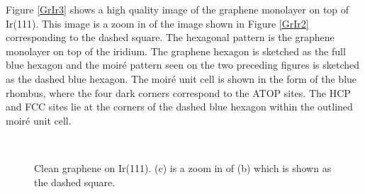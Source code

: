 Figure \ref{GrIr3} shows a high quality image of the graphene monolayer on top of Ir(111). This image is a zoom in of the image shown in Figure \ref{GrIr2} corresponding to the dashed square. The hexagonal pattern is the graphene monolayer on top of the iridium. The graphene hexagon is sketched as the full blue hexagon and the moiré pattern seen on the two preceding figures is sketched as the dashed blue hexagon. The moiré unit cell is shown in the form of the blue rhombus, where the four dark corners correspond to the ATOP sites. The HCP and FCC sites lie at the corners of the dashed blue hexagon within the outlined moiré unit cell.

\begin{figure}[H]
  \\
\caption{Clean graphene on Ir(111). (c) is a zoom in of (b) which is shown as the dashed square.}
\label{GrIr}
\end{figure}

